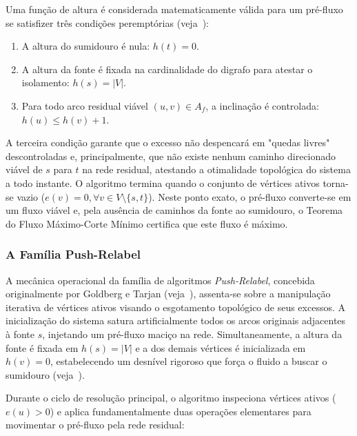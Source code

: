 \documentclass[12pt,a4paper]{article}
\begin{document}
Uma função de altura é considerada matematicamente válida para um pré-fluxo se satisfizer três condições peremptórias (veja~\cite{korte2018combinatorial}):
\begin{enumerate}
    \item A altura do sumidouro é nula: $h(t) = 0$.
    \item A altura da fonte é fixada na cardinalidade do digrafo para atestar o isolamento: $h(s) = |V|$.
    \item Para todo arco residual viável $(u,v) \in A_f$, a inclinação é controlada: $h(u) \le h(v) + 1$.
\end{enumerate}

A terceira condição garante que o excesso não despencará em "quedas livres" descontroladas e, principalmente, que não existe nenhum caminho direcionado viável de $s$ para $t$ na rede residual, atestando a otimalidade topológica do sistema a todo instante. O algoritmo termina quando o conjunto de vértices ativos torna-se vazio ($e(v) = 0, \forall v \in V \setminus \{s, t\}$). Neste ponto exato, o pré-fluxo converte-se em um fluxo viável e, pela ausência de caminhos da fonte ao sumidouro, o Teorema do Fluxo Máximo-Corte Mínimo certifica que este fluxo é máximo.

\subsubsection{A Família Push-Relabel}

A mecânica operacional da família de algoritmos \textit{Push-Relabel}, concebida originalmente por Goldberg e Tarjan (veja~\cite{goldberg1988new}), assenta-se sobre a manipulação iterativa de vértices ativos visando o esgotamento topológico de seus excessos. A inicialização do sistema satura artificialmente todos os arcos originais adjacentes à fonte $s$, injetando um pré-fluxo maciço na rede. Simultaneamente, a altura da fonte é fixada em $h(s) = |V|$ e a dos demais vértices é inicializada em $h(v) = 0$, estabelecendo um desnível rigoroso que força o fluido a buscar o sumidouro (veja~\cite{ahuja1993network}).

Durante o ciclo de resolução principal, o algoritmo inspeciona vértices ativos ($e(u) > 0$) e aplica fundamentalmente duas operações elementares para movimentar o pré-fluxo pela rede residual:
\end{document}
